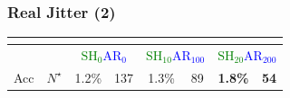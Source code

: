 \begin{frame}
\frametitle{Real Jitter (2)}
\centering
\begin{scriptsize}
\begin{table}
\begin{tabular}{|c|c|c|c|c|c|c|c|}
\multicolumn{8}{c}{}\\
\hline
\multicolumn{2}{|c|}{} & \multicolumn{2}{c|}{\textcolor{green}{$\mathrm{SH}_{0}$}\textcolor{blue}{$\mathrm{AR}_{0}$}} & \multicolumn{2}{c|}{\textcolor{green}{$\mathrm{SH}_{10}$}\textcolor{blue}{$\mathrm{AR}_{100}$}} & \multicolumn{2}{c|}{\textcolor{green}{$\mathrm{SH}_{20}$}\textcolor{blue}{$\mathrm{AR}_{200}$}} \\ \hline
Acc        & $N^\star$       & 1.2\%                      & 137                      & 1.3\%                       & 89                         & \textbf{1.8\%}              & \textbf{54}                \\ \hline
\end{tabular}
\end{table}
\end{scriptsize}
\vspace*{-18pt}

\centering
{}


\end{frame}
